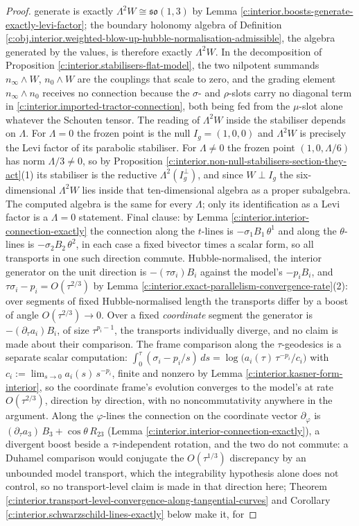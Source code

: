 \documentclass[11pt]{article}
\theoremstyle{definition}
\theoremstyle{plain}
\providecommand{\nInf}{}\renewcommand{\nInf}{n_\infty}
\providecommand{\nO}{}\renewcommand{\nO}{n_0}
\begin{document}
\begin{proof}
generate is exactly $\Lambda^2 W \cong \mathfrak{so}(1,3)$ by Lemma \ref{c:interior.boosts-generate-exactly-levi-factor}; the boundary holonomy algebra of Definition \ref{c:obj.interior.weighted-blow-up-hubble-normalisation-admissible}, the algebra generated by the values, is therefore exactly $\Lambda^2 W$. In the decomposition of Proposition \ref{c:interior.stabilisers-flat-model}, the two nilpotent summands $\nInf\wedge W$, $\nO\wedge W$ are the couplings that scale to zero, and the grading element $\nInf \wedge \nO$ receives no connection because the $\sigma$- and $\rho$-slots carry no diagonal term in \ref{c:interior.imported-tractor-connection}, both being fed from the $\mu$-slot alone whatever the Schouten tensor. The reading of $\Lambda^2 W$ inside the stabiliser depends on $\Lambda$. For $\Lambda = 0$ the frozen point is the null $I_g = (1,0,0)$ and $\Lambda^2 W$ is precisely the Levi factor of its parabolic stabiliser. For $\Lambda \neq 0$ the frozen point $(1, 0, \Lambda/6)$ has norm $\Lambda/3 \neq 0$, so by Proposition \ref{c:interior.non-null-stabilisers-section-they-act}(1) its stabiliser is the reductive $\Lambda^2(I_g^\perp)$, and since $W \perp I_g$ the six-dimensional $\Lambda^2 W$ lies inside that ten-dimensional algebra as a proper subalgebra. The computed algebra is the same for every $\Lambda$; only its identification as a Levi factor is a $\Lambda = 0$ statement. Final clause: by Lemma \ref{c:interior.interior-connection-exactly} the connection along the $t$-lines is $-\sigma_1 B_1\,\theta^1$ and along the $\theta$-lines is $-\sigma_2 B_2\,\theta^2$, in each case a fixed bivector times a scalar form, so all transports in one such direction commute. Hubble-normalised, the interior generator on the unit direction is $-(\tau\sigma_i)B_i$ against the model's $-p_iB_i$, and $\tau\sigma_i - p_i = O(\tau^{2/3})$ by Lemma \ref{c:interior.exact-parallelism-convergence-rate}(2): over segments of fixed Hubble-normalised length the transports differ by a boost of angle $O(\tau^{2/3}) \to 0$. Over a fixed \emph{coordinate} segment the generator is $-(\partial_\tau a_i)B_i$, of size $\tau^{p_i - 1}$, the transports individually diverge, and no claim is made about their comparison. The frame comparison along the $\tau$-geodesics is a separate scalar computation: $\int_0^\tau(\sigma_i - p_i/s)\,ds = \log\bigl(a_i(\tau)\,\tau^{-p_i}/c_i\bigr)$ with $c_i := \lim_{s \to 0} a_i(s)\,s^{-p_i}$, finite and nonzero by Lemma \ref{c:interior.kasner-form-interior}, so the coordinate frame's evolution converges to the model's at rate $O(\tau^{2/3})$, direction by direction, with no noncommutativity anywhere in the argument. Along the $\varphi$-lines the connection on the coordinate vector $\partial_\varphi$ is $(\partial_\tau a_3)\,B_3 + \cos\theta\,R_{23}$ (Lemma \ref{c:interior.interior-connection-exactly}), a divergent boost beside a $\tau$-independent rotation, and the two do not commute: a Duhamel comparison would conjugate the $O(\tau^{1/3})$ discrepancy by an unbounded model transport, which the integrability hypothesis alone does not control, so no transport-level claim is made in that direction here; Theorem \ref{c:interior.transport-level-convergence-along-tangential-curves} and Corollary \ref{c:interior.schwarzschild-lines-exactly} below make it, for 
\end{proof}
\end{document}
